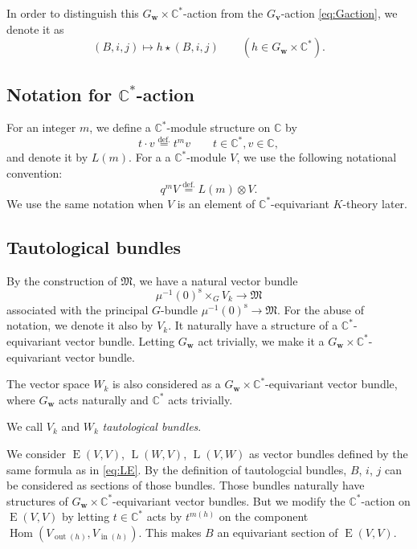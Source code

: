 \documentclass[12pt]{amsart}
\def\Bbb{\mathbb}
\def\frak{\mathfrak}
\theoremstyle{definition}
\theoremstyle{remark}
\numberwithin{equation}{subsection}
\newcommand{\defeq}{\overset{\operatorname{\scriptstyle def.}}{=}}
\newcommand{\C}{{\Bbb C}}
\newcommand{\Hom}{\operatorname{Hom}}
\newcommand{\vin}{\operatorname{in}} %
\newcommand{\vout}{\operatorname{out}} %
\newcommand{\M}{{\frak M}} %
\newcommand{\bv}{{\mathbf v}} %
\newcommand{\bw}{{\mathbf w}} %
\newcommand{\HomE}{\operatorname{E}}
\newcommand{\HomL}{\operatorname{L}}
\begin{document}
In order to distinguish this $G_\bw\times\C^*$-action from the
$G_\bv$-action \eqref{eq:Gaction}, we denote it as
\begin{equation*}
   (B,i,j) \mapsto h\star (B,i,j) \qquad (h\in G_\bw\times\C^*).
\end{equation*}

\subsection{Notation for $\C^*$-action}

For an integer $m$, we define a $\C^*$-module structure on $\C$ by 
\begin{equation}\label{eq:L(m)}
   t\cdot v \defeq t^m v \qquad\text{$t\in\C^*, v\in \C$},
\end{equation}
and denote it by $L(m)$. For a a $\C^*$-module $V$, we use the
following notational convention:
\begin{equation}\label{eq:Cst_notation}
   q^m V \defeq L(m)\otimes V.
\end{equation}
We use the same notation when $V$ is an element of $\C^*$-equivariant
$K$-theory later.

\subsection{Tautological bundles}
By the construction of $\M$, we have a natural vector bundle
\begin{equation*}
   \mu^{-1}(0)^{\operatorname{s}}\times_G V_k \to \M
\end{equation*}
associated with the principal $G$-bundle
$\mu^{-1}(0)^{\operatorname{s}}\to \M$.
%
For the abuse of notation, we
denote it also by $V_k$. It naturally have a structure of a
$\C^*$-equivariant vector bundle. Letting $G_\bw$ act trivially, we
make it a $G_\bw\times \C^*$-equivariant vector bundle.

The vector space $W_k$ is also considered as 
a $G_\bw\times \C^*$-equivariant vector bundle, where $G_\bw$ acts
naturally and $\C^*$ acts trivially.

We call $V_k$ and $W_k$ {\it tautological bundles}.

We consider $\HomE(V,V)$, $\HomL(W,V)$, $\HomL(V, W)$ as vector
bundles defined by the same formula as in \eqref{eq:LE}. By the
definition of tautologcial bundles, $B$, $i$, $j$ can be considered as 
sections of those bundles.
%
Those bundles naturally have structures of $G_\bw\times
\C^*$-equivariant vector bundles. But we modify the $\C^*$-action on
$\HomE(V,V)$ by letting $t\in \C^*$ acts by $t^{m(h)}$ on the
component \( \Hom(V_{\vout(h)}, V_{\vin(h)}) \).  This makes $B$ an
equivariant section of $\HomE(V,V)$.
\end{document}
